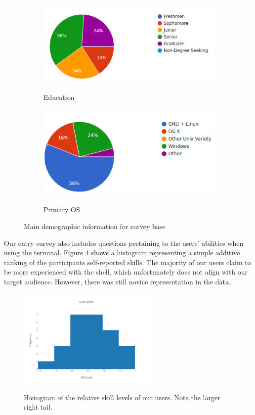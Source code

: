 \begin{figure}[ht]
  \begin{subfigure}[b]{0.45\textwidth}
\includegraphics[width=\textwidth]{figures/stats/edu.png}
\label{fig:edu}
    \caption{Education}
  \end{subfigure}
  \quad
  \begin{subfigure}[b]{0.45\textwidth}
    \includegraphics[width=\textwidth]{figures/stats/os.png}
\label{fig:OS}
    \caption{Primary OS}
  \end{subfigure}
  \caption{Main demographic information for survey base}
\end{figure}

Our entry survey also includes questions pertaining to the users' abilities when
using the terminal. Figure \ref{fig:skillz} shows a histogram representing a
simple additive ranking of the participants self-reported skills. The majority
of our users claim to be more experienced with the shell, which unfortunately
does not align with our target audience. However, there was still novice
representation in the data.

\begin{figure}[H]
  \centering
  \includegraphics[width=0.6\textwidth]{figures/stats/user-skills.png}
\label{fig:skillz}
  \caption{Histogram of the relative skill levels of our users. Note the larger
    right tail.}
\end{figure}

